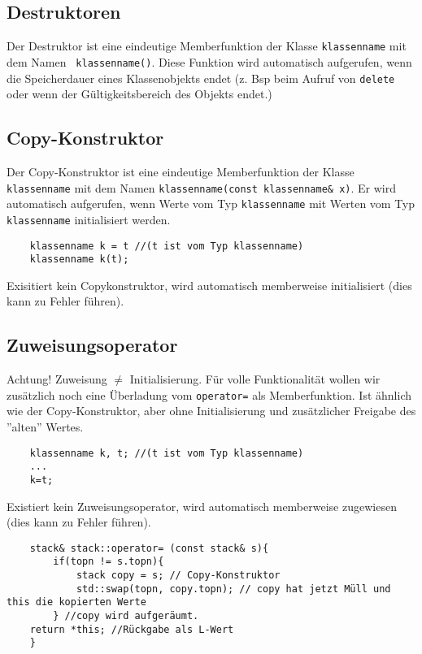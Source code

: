 \subsection{Destruktoren}
Der Destruktor ist eine eindeutige Memberfunktion der Klasse \texttt{klassenname} mit dem Namen \texttt{~klassenname()}. Diese Funktion wird automatisch aufgerufen, wenn die Speicherdauer eines Klassenobjekts endet (z. Bsp beim Aufruf von \texttt{delete} oder wenn der Gültigkeitsbereich des Objekts endet.)
\subsection{Copy-Konstruktor}
Der Copy-Konstruktor ist eine eindeutige Memberfunktion der Klasse \texttt{klassenname} mit dem Namen \texttt{klassenname(const klassenname\& x)}. Er wird automatisch aufgerufen, wenn Werte vom Typ \texttt{klassenname} mit Werten vom Typ \texttt{klassenname} initialisiert werden.
\begin{lstlisting}
	klassenname k = t //(t ist vom Typ klassenname)
	klassenname k(t);
\end{lstlisting}
Exisitiert kein Copykonstruktor, wird automatisch memberweise initialisiert (dies kann zu Fehler führen).
\subsection{Zuweisungsoperator}
Achtung! Zuweisung $\neq$ Initialisierung. Für volle Funktionalität wollen wir zusätzlich noch eine Überladung vom \texttt{operator=} als Memberfunktion. Ist ähnlich wie der Copy-Konstruktor, aber ohne Initialisierung und zusätzlicher Freigabe des ''alten'' Wertes.
\begin{lstlisting}
	klassenname k, t; //(t ist vom Typ klassenname)
	...
	k=t;
\end{lstlisting}
Existiert kein Zuweisungsoperator, wird automatisch memberweise zugewiesen (dies kann zu Fehler führen).
\begin{lstlisting}
	stack& stack::operator= (const stack& s){
		if(topn != s.topn){
			stack copy = s; // Copy-Konstruktor
			std::swap(topn, copy.topn); // copy hat jetzt Müll und this die kopierten Werte
		} //copy wird aufgeräumt.
	return *this; //Rückgabe als L-Wert
	}
\end{lstlisting}




